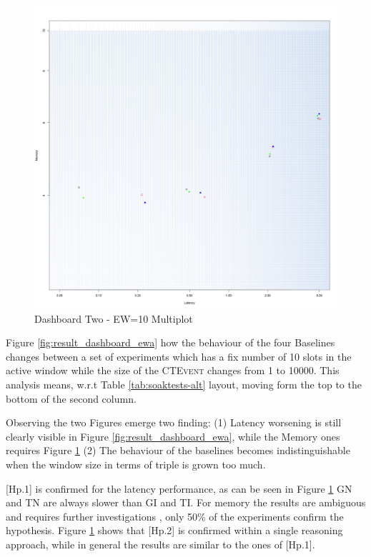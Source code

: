 \begin{figure}[htb]
	\centering
	\includegraphics[width=0.90\linewidth]{images/dashboard-2}	
	\caption{Dashboard Two - EW=10 Multiplot} 
	\label{fig:result_dashboard_ewb}
\end{figure}


Figure \ref{fig:result_dashboard_ewa} how the behaviour of the four Baselines changes between a set of experiments which has a fix number of 10 slots in the active window while the size of the \textsc{CTEvent} changes from 1 to 10000. This analysis means, w.r.t Table \ref{tab:soaktests-alt} layout, moving form the top to the bottom of the second column.

Observing the two Figures emerge two finding: (1) Latency worsening is still clearly visible in Figure \ref{fig:result_dashboard_ewa}, while the Memory ones requires Figure \ref{fig:result_dashboard_ewb} (2) The behaviour of the baselines becomes indistinguishable when the window size in terms of triple is grown too much. 

[Hp.1] is confirmed for the latency performance, as can be seen in Figure \ref{fig:result_dashboard_ewb} GN and TN are always slower than GI and TI. For memory the results are ambiguous and requires further investigations , only 50\% of the experiments confirm the hypothesis. Figure \ref{fig:result_dashboard_ewb} shows that [Hp.2] is confirmed within a single reasoning approach, while in general the results are similar to the ones of [Hp.1].

